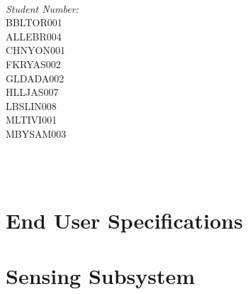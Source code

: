 \documentclass[12pt]{article}
\makeatletter
\let\thedate\@date
\makeatother
\begin{document}
\begin{titlepage}
\begin{minipage}{0.4\textwidth}
\begin{flushleft}
			\end{flushleft}
			\end{minipage}~
			\begin{minipage}{0.4\textwidth}
			\begin{flushright} \large
			\emph{Student Number:} \\
      BBLTOR001\\
      ALLEBR004\\
      CHNYON001\\
      FKRYAS002\\
      GLDADA002\\
      HLLJAS007\\
      LBSLIN008\\
      MLTIVI001\\
      MBYSAM003\\									%
		\end{flushright}
	\end{minipage}\\[0.5 cm]
	
	{\large \thedate}\\[0.5 cm]
 
	\vfill
	
\end{titlepage}


\tableofcontents
\pagebreak


\section{End User Specifications}

\newpage
\section{Sensing Subsystem} 
\end{document}
